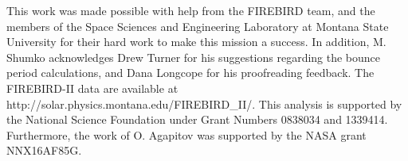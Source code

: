 \documentclass[draft, linenumbers]{agujournal}
\begin{document}
%
%
%
%
%
%
%


\acknowledgments
This work was made possible with help from the FIREBIRD team, and the members of the Space Sciences and Engineering Laboratory at Montana State University for their hard work to make this mission a success. In addition, M. Shumko acknowledges Drew Turner for his suggestions regarding the bounce period calculations, and Dana Longcope for his proofreading feedback. The FIREBIRD-II data are available at http://solar.physics.montana.edu/FIREBIRD\_II/. This analysis is supported by the National Science Foundation under Grant Numbers 0838034 and 1339414. Furthermore, the work of O. Agapitov was supported by the NASA grant NNX16AF85G.
\end{document}
